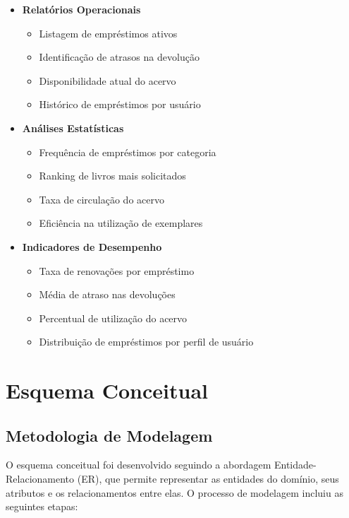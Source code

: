 \documentclass[12pt,a4paper]{article}
\begin{document}
\begin{conceptbox}
\begin{itemize}
    \item \textbf{Relatórios Operacionais}
    \begin{itemize}
        \item Listagem de empréstimos ativos
        \item Identificação de atrasos na devolução
        \item Disponibilidade atual do acervo
        \item Histórico de empréstimos por usuário
    \end{itemize}

    \item \textbf{Análises Estatísticas}
    \begin{itemize}
        \item Frequência de empréstimos por categoria
        \item Ranking de livros mais solicitados
        \item Taxa de circulação do acervo
        \item Eficiência na utilização de exemplares
    \end{itemize}

    \item \textbf{Indicadores de Desempenho}
    \begin{itemize}
        \item Taxa de renovações por empréstimo
        \item Média de atraso nas devoluções
        \item Percentual de utilização do acervo
        \item Distribuição de empréstimos por perfil de usuário
    \end{itemize}
\end{itemize}
\end{conceptbox}

\section{Esquema Conceitual}

\subsection{Metodologia de Modelagem}
O esquema conceitual foi desenvolvido seguindo a abordagem Entidade-Relacionamento (ER), que permite representar as entidades do domínio, seus atributos e os relacionamentos entre elas. O processo de modelagem incluiu as seguintes etapas:
\end{document}

